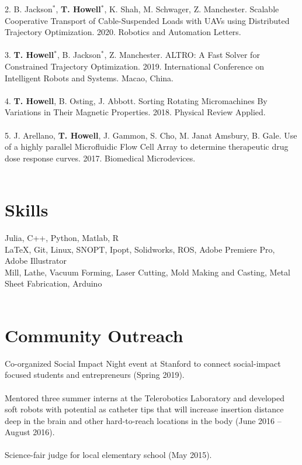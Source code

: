 \documentclass[margin,line]{res}
\begin{document}
\begin{resume}
2. B. Jackson$^*$, \textbf{T. Howell}$^*$, K. Shah, M. Schwager, Z. Manchester. Scalable Cooperative Transport of Cable-Suspended Loads with UAVs using Distributed Trajectory Optimization. 2020. Robotics and Automation Letters.\\
\\
3. \textbf{T. Howell}$^*$, B. Jackson$^*$, Z. Manchester. ALTRO: A Fast Solver for Constrained Trajectory Optimization. 2019. International Conference on Intelligent Robots and Systems. Macao, China.\\
\\
4. \textbf{T. Howell}, B. Osting, J. Abbott. Sorting Rotating Micromachines By Variations in Their Magnetic
Properties. 2018. Physical Review Applied.\\
\\
5. J. Arellano, \textbf{T. Howell}, J. Gammon, S. Cho, M. Janat Amsbury, B. Gale. Use of a highly parallel
Microfluidic Flow Cell Array to determine therapeutic drug dose response curves. 2017. Biomedical
Microdevices.\\
\\
\section{\sc Skills}
Julia, C++, Python, Matlab, R\\
\LaTeX, Git, Linux, SNOPT, Ipopt, Solidworks, ROS, Adobe Premiere Pro, Adobe Illustrator \\
Mill, Lathe, Vacuum Forming, Laser Cutting, Mold Making and Casting, Metal Sheet Fabrication, Arduino\\
\\
\section{\sc Community Outreach}
Co-organized Social Impact Night event at Stanford to connect social-impact focused students and entrepreneurs (Spring 2019).\\
\\
Mentored three summer interns at the Telerobotics Laboratory and developed soft robots with potential as catheter tips that will increase insertion distance deep in the brain and other hard-to-reach locations in the body (June 2016 – August 2016).\\
\\
Science-fair judge for local elementary school (May 2015).\\
\\


\end{resume}
\end{document}
